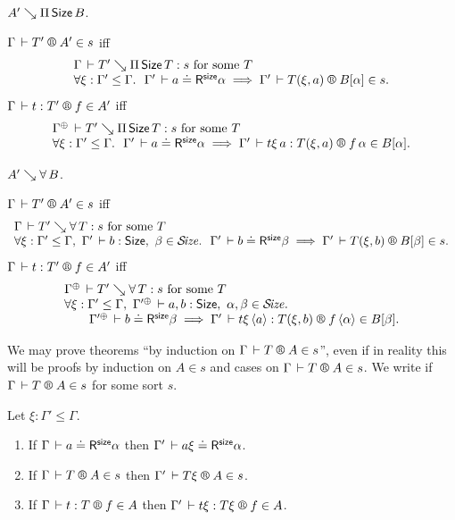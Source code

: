 \documentclass[acmlarge,review,anonymous]{acmart}\settopmatter{printfolios=true}
\begin{document}
\begin{caselist}
\vspace{2ex}
\nextcase $A' \searrow \Pi\,\mathsf{Size}\, B$.

\noindent
$\LRTS \Gamma {T'} {A'} s$ iff
\[
\begin{array}{l}
\Gamma \der T' \evalsto \piT \Size T : s \mforsome T\\
\forall \xi : \Gamma' \leq \Gamma.\ \
\LRSize {\Gamma'} a \alpha
\implies \LRTS {\Gamma'} {T(\xi,a)} {B[\alpha]} s
.
\end{array}
\]
$\LR \Gamma t {T'} f {A'}$ iff
\[
\begin{array}{l}
\resurrect\Gamma \der T' \evalsto \piT \Size T : s \mforsome T\\
\forall \xi : \Gamma' \leq \Gamma.\ \
\LRSize {\Gamma'} a \alpha
\implies \LR {\Gamma'} {t\xi\,a} {T(\xi,a)} {f\,\alpha} {B[\alpha]}
.
\end{array}
\]

\vspace{2ex}
\nextcase $A' \searrow \forall\, B$.

\noindent
$\LRTS \Gamma {T'} {A'} s$ iff
\[
\begin{array}{l}
\Gamma \der T' \evalsto \forallT T : s \mforsome T\\
\forall \xi : \Gamma' \leq \Gamma,\
{\Gamma'} \der b : \Size,\
\beta \in \SIZE. \ \
\LRSize {\Gamma'} b \beta
\implies \LRTS {\Gamma'} {T(\xi,b)} {B[\beta]} s
.
\end{array}
\]
$\LR \Gamma t {T'} f {A'}$ iff
\[
\begin{array}{l}
\resurrect\Gamma \der T' \evalsto \forallT T : s \mforsome T\\
\forall \xi : \Gamma' \leq \Gamma,\
\resurrect{\Gamma'} \der a,b : \Size,\
\alpha,\beta \in \SIZE. \ \\ \qquad
\LRSize {\resurrect{\Gamma'}} b \beta
\implies \LR {\Gamma'} {t\xi\,\ann a} {T(\xi,b)} {f\,\ann\alpha} {B[\beta]}
.
\end{array}
\]
\end{caselist}
We may prove theorems ``by induction on $\LRTS \Gamma T A s$'', even if in reality this will be proofs by induction on $A \in s$ and cases on $\LRTS \Gamma T A s$.
We write \fbox{$\RG \Gamma T A$} if\/ $\LRTS \Gamma T A s$ for some sort $s$.


\begin{lemma}[Weakening]
  Let $\xi : \Gamma' \leq \Gamma$.
  \begin{enumerate}
  \item If\/ $\Gamma \,\vdash a \doteq \mathsf{R}^{\mathsf{size}} \alpha$ then $\Gamma' \,\vdash a\xi \doteq \mathsf{R}^{\mathsf{size}} \alpha$.
  \item If\/ $\LRTS {\Gamma} T A s$ then $\LRTS{\Gamma'}{T\xi}A s$.
  \item If\/ $\LR \Gamma t T f A$ then $\LR{\Gamma'}{t\xi}{T\xi} f A$.
  \end{enumerate}
\end{lemma}
\end{document}
